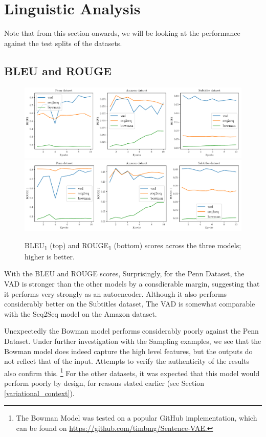 \documentclass[12pt,twoside]{report}
\begin{document}
\section{Linguistic Analysis}
Note that from this section onwards, we will be looking at the performance against the test splits of the datasets. 

\subsection{BLEU and ROUGE}
\begin{figure}[!ht]
	\centering
	\includegraphics[width=150mm]{results/bleu1.pdf}
	\includegraphics[width=150mm]{results/rouge_1.pdf}
	\caption{BLEU\textsubscript{1} (top) and ROUGE\textsubscript{1} (bottom) scores across the three models; higher is better.\label{r:bleu_rouge}}
  \end{figure}


With the BLEU and ROUGE scores, Surprisingly, for the Penn Dataset, the VAD is stronger than the other models by a consdierable margin, suggesting that it performs very strongly as an autoencoder. Although it also performs considerably better on the Subtitles dataset, The VAD is somewhat comparable with the Seq2Seq model on the Amazon dataset.

Unexpectedly the Bowman model performs considerably poorly against the Penn Dataset. Under further investigation with the Sampling examples, we see that the Bowman model does indeed capture the high level features, but the outputs do not reflect that of the input. Attempts to verify the authenticity of the results also confirm this. \footnote{The Bowman Model was tested on a popular GitHub implementation, which can be found on \href{https://github.com/timbmg/Sentence-VAE}{https://github.com/timbmg/Sentence-VAE.}
} For the other datasets, it was expected that this model would perform poorly by design, for reasons stated earlier (see Section \ref{variational_context}). 
\end{document}
